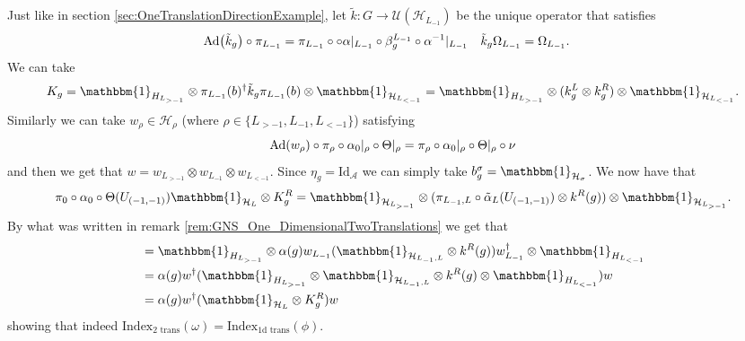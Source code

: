 \documentclass[12pt,a4paper,twoside]{article}
\let\originalleft\left
\let\originalright\right
\renewcommand{\left}{\mathopen{}\mathclose\bgroup\originalleft}
\renewcommand{\right}{\aftergroup\egroup\originalright}
\newcommand{\UU}{\mathcal U}
\newcommand{\HH}{\mathcal H}
\renewcommand{\AA}{\mathcal A}
\newcommand{\id}{\mathbbm{1}}
\newcommand{\Ad}[1]{\textrm{Ad}\left(#1\right)}
\theoremstyle{definition}
\numberwithin{equation}{section}
\begin{document}
Just like in section \ref{sec:OneTranslationDirectionExample}, let $\tilde k:G\rightarrow \UU(\HH_{L_{-1}})$ be the unique operator that satisfies
\begin{align}
	\Ad{\tilde{k}_g}\circ\pi_{L_{-1}}&=\pi_{L_{-1}}\circ \circ\alpha|_{L_{-1}}\circ\beta_g^{L_{-1}}\circ \alpha^{-1}|_{L_{-1}}&\tilde k_g\Omega_{L_{-1}}&=\Omega_{L_{-1}}.
\end{align}
We can take
\begin{equation}
	K_g=\id_{H_{L_{>-1}}}\otimes \pi_{L_{-1}}(b)^\dagger \tilde k_g \pi_{L_{-1}}(b) \otimes\id_{\HH_{L_{<-1}}} =\id_{H_{L_{>-1}}}\otimes (k_g^L\otimes k_g^R) \otimes\id_{\HH_{L_{<-1}}}.
\end{equation}
Similarly we can take $w_\rho\in\HH_\rho$ (where $\rho\in\{L_{>-1},L_{-1},L_{<-1}\}$) satisfying
\begin{equation}
	\Ad{w_\rho}\circ\pi_\rho\circ\alpha_{0}|_\rho\circ\Theta|_\rho=\pi_\rho\circ\alpha_{0}|_\rho\circ\Theta|_\rho\circ\nu
\end{equation}
and then we get that $w=w_{L_{>-1}}\otimes w_{L_{-1}}\otimes w_{L_{<-1}}$. Since $\eta_g=\textrm{Id}_{\AA}$ we can simply take $b_g^\sigma=\id_{\HH_\sigma}$. We now have that
\begin{equation}
	\pi_0\circ\alpha_0\circ\Theta(U_{(-1,-1)})\id_{\HH_L}\otimes K_g^R=\id_{\HH_{L_{>-1}}}\otimes(\pi_{L_{-1},L}\circ\tilde\alpha_L(U_{(-1,-1)})\otimes k^R(g))\otimes\id_{\HH_{L_{>-1}}}.
\end{equation}
By what was written in remark \ref{rem:GNS_One_DimensionalTwoTranslations} we get that
\begin{align}
	&=\id_{H_{L_{>-1}}}\otimes\alpha(g) w_{L_{-1}}(\id_{\HH_{L_{-1},L}}\otimes k^R(g))w_{L_{-1}}^\dagger\otimes \id_{H_{L_{<-1}}}\\
	&=\alpha(g)w^\dagger (\id_{H_{L_{>-1}}}\otimes \id_{\HH_{L_{-1},L}}\otimes k^R(g)\otimes \id_{H_{L_{<-1}}}) w\\
	&=\alpha(g)w^\dagger (\id_{\HH_L}\otimes K^R_g) w
\end{align}
showing that indeed $\textrm{Index}_{\text{2 trans}}(\omega)=\textrm{Index}_{\text{1d trans}}(\phi)$.
\end{document}
